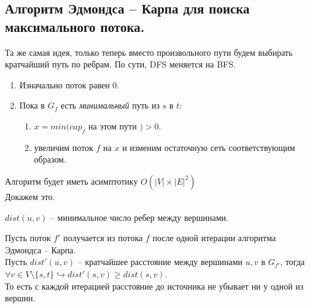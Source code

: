 \subsection{Алгоритм Эдмондса -- Карпа для поиска максимального потока.}
Та же самая идея, только теперь вместо произвольного пути будем выбирать кратчайший путь по ребрам. По сути, DFS меняется на BFS.
\begin{enumerate}
	\item Изначально поток равен 0.
	\item Пока в $G_f$ есть \textit{минимальный} путь из $s $ в $t$:
		\begin{enumerate}
			\item $x = min(cap_f$ на этом пути $) > 0$.
			\item  увеличим поток $f$ на  $x$  и изменим остаточную сеть соответствующим образом.
		\end{enumerate}
\end{enumerate}

Алгоритм будет иметь асимптотику $O(\lvert V \rvert \times \lvert E \rvert ^ 2)$ \\

Докажем это.
\begin{Def}
	$dist(u, v)$ -- минимальное число ребер между вершинами.
\end{Def}

\begin{lemma}
	Пусть поток $f'$ получается из потока $f$ после одной итерации алгоритма Эдмондса -- Карпа. \\
	Пусть $dist'(u, v)$ -- кратчайшее расстояние между вершинами $u, v$ в $G_{f'}$, тогда
	$\forall v \in V \setminus \{s, t\} \hookrightarrow dist'(s, v) \geq dist(s, v)$.  \\
	То есть с каждой итерацией расстояние до источника не убывает ни у одной из вершин.
\end{lemma}

